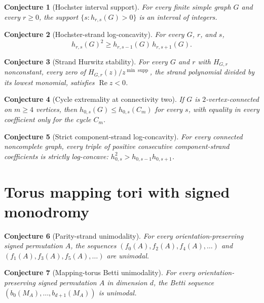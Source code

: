 \documentclass[11pt]{article}
\newtheorem{conjecture}{Conjecture}
\theoremstyle{definition}
\begin{document}
\begin{conjecture}[Hochster interval support]\label{x11}
For every finite simple graph $G$ and every $r\ge0$, the support $\{s:h_{r,s}(G)>0\}$ is an interval of integers.
\end{conjecture}

\begin{conjecture}[Hochster-strand log-concavity]\label{x12}
For every $G$, $r$, and $s$,
\[
h_{r,s}(G)^2\ge h_{r,s-1}(G)\,h_{r,s+1}(G).
\]
\end{conjecture}

\begin{conjecture}[Strand Hurwitz stability]\label{x13}
For every $G$ and $r$ with $H_{G,r}$ nonconstant, every zero of $H_{G,r}(z)/z^{\min\operatorname{supp}}$, the strand polynomial divided by its lowest monomial, satisfies $\operatorname{Re}z<0$.
\end{conjecture}

\begin{conjecture}[Cycle extremality at connectivity two]\label{x14}
If $G$ is $2$-vertex-connected on $m\ge4$ vertices, then $h_{0,s}(G)\le h_{0,s}(C_m)$ for every $s$, with equality in every coefficient only for the cycle $C_m$.
\end{conjecture}

\begin{conjecture}[Strict component-strand log-concavity]\label{x15}
For every connected noncomplete graph, every triple of positive consecutive component-strand coefficients is strictly log-concave: $h_{0,s}^2>h_{0,s-1}h_{0,s+1}$.
\end{conjecture}

\section{Torus mapping tori with signed monodromy}

\begin{conjecture}[Parity-strand unimodality]\label{x16}
For every orientation-preserving signed permutation $A$, the sequences $(f_0(A),f_2(A),f_4(A),\ldots)$ and $(f_1(A),f_3(A),f_5(A),\ldots)$ are unimodal.
\end{conjecture}

\begin{conjecture}[Mapping-torus Betti unimodality]\label{x17}
For every orientation-preserving signed permutation $A$ in dimension $d$, the Betti sequence $(b_0(M_A),\ldots,b_{d+1}(M_A))$ is unimodal.
\end{conjecture}
\end{document}
